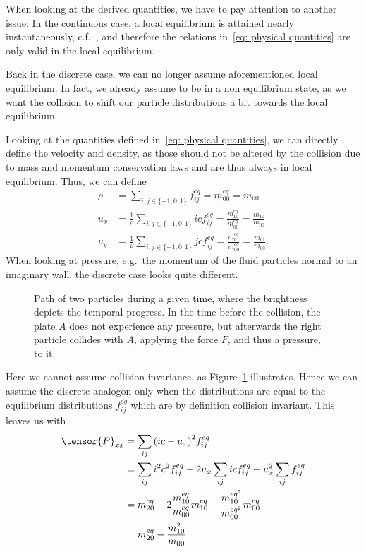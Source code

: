 When looking at the derived quantities, we have to pay attention to another issue:
In the continuous case, a local equilibrium is attained nearly instantaneously, c.f.~\cite[page 218]{smits2000physical}, and therefore the relations in~\eqref{eq: physical quantities} are only valid in the local equilibrium.

Back in the discrete case, we can no longer assume aforementioned local equilibrium.
In fact, we already assume to be in a non equilibrium state, as we want the collision to shift our particle distributions a bit towards the local equilibrium.

Looking at the quantities defined in~\eqref{eq: physical quantities}, we can directly define the velocity and density, as those should not be altered by the collision due to mass and momentum conservation laws and are thus always in local equilibrium.
Thus, we can define
\begin{align}
  \rho & = \sum_{i,j \in \{-1,0,1\}} f_{ij}^{eq} = m_{00}^{eq} = m_{00}
  \label{eq: density definition}\\
  u_x  & = \frac{1}{\rho} \sum_{i,j \in \{-1,0,1\}} ic f_{ij}^{eq} = \frac{m_{10}^{eq}}{m_{00}^{eq}} = \frac{m_{10}}{m_{00}}
  \label{eq: x velocity definition}\\
  u_y  & = \frac{1}{\rho} \sum_{i,j \in \{-1,0,1\}} jc f_{ij}^{eq} = \frac{m_{01}^{eq}}{m_{00}^{eq}} = \frac{m_{01}}{m_{00}}.
  \label{eq: y velocity definition}
\end{align}
When looking at pressure, e.g.\ the momentum of the fluid particles normal to an imaginary wall, the discrete case looks quite different.
\begin{figure}
\centering

\caption{Path of two particles during a given time, where the brightness depicts the temporal progress. In the time before the collision, the plate $A$ does not experience any pressure, but afterwards the right particle collides with $A$, applying the force $F$, and thus a pressure, to it.}
\label{fig: billard table}
\end{figure}
Here we cannot assume collision invariance, as Figure~\ref{fig: billard table} illustrates.
Hence we can assume the discrete analogon only when the distributions are equal to the equilibrium distributions $f_{ij}^{eq}$ which are by definition collision invariant.
This leaves us with
\begin{equation}
  \begin{aligned}
    \tensor{P}_{xx}
    & = \sum_{ij} {(ic - u_x)}^2 f_{ij}^{eq}
    \\ & =
    \sum_{ij} i^2 c^2 f_{ij}^{eq} - 2 u_x \sum_{ij} ic f_{ij}^{eq} + u_x^2 \sum_{ij}f_{ij}^{eq}
    \\ & =
    m_{20}^{eq} - 2 \frac{m_{10}^{eq}}{m_{00}^{eq}} m_{10}^{eq} + \frac{m_{10}^{{eq}^2}}{m_{00}^{{eq}^2}} m_{00}^{eq}
    \\ & = m_{20}^{eq} - \frac{m_{10}^2}{m_{00}}
  \end{aligned}
\end{equation}
